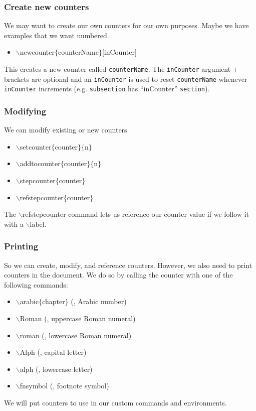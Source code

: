 \begin{frame}  \frametitle{Create new counters}
	We may want to create our own counters for our own purposes. Maybe we have examples that we want numbered.
	\begin{itemize}
		\item[] {\color{command}$\backslash$newcounter\color{braces}$\{${\color{black}counterName}$\}$\color{black}[inCounter]}
	\end{itemize}
	This creates a new counter called \texttt{counterName}. The \texttt{inCounter} argument $+$ brackets are optional and an \texttt{inCounter} is used to reset \texttt{counterName} whenever \texttt{inCounter} increments (e.g. \texttt{subsection} has ``inCounter'' \texttt{section}).
\end{frame}

\begin{frame}  \frametitle{Modifying}
	We can modify existing or new counters.
	\begin{itemize}
		\item[] {\color{command}$\backslash$setcounter\color{braces}$\{${\color{black}counter}$\}\{${\color{black}n}$\}$}
		\item[] {\color{command}$\backslash$addtocounter\color{braces}$\{${\color{black}counter}$\}\{${\color{black}n}$\}$}
		\item[] {\color{command}$\backslash$stepcounter\color{braces}$\{${\color{black}counter}$\}$}
		\item[] {\color{command}$\backslash$refstepcounter\color{braces}$\{${\color{black}counter}$\}$}
	\end{itemize}
	The {\color{command}$\backslash$refstepcounter} command lets us reference our counter value if we follow it with a {\color{command}$\backslash$label}.
\end{frame}

\begin{frame}  \frametitle{Printing}
	So we can create, modify, and reference counters. However, we also need to print counters in the document. We do so by calling the counter with one of the following commands:
	\setcounter{temp}{4}
	\begin{itemize}
		\item[] {\color{command}$\backslash$arabic}{\color{braces}$\{${\color{black}chapter}$\}$} (, Arabic number)
		\item[] {\color{command}$\backslash$Roman} (, uppercase Roman numeral)
		\item[] {\color{command}$\backslash$roman} (, lowercase Roman numeral)
		\item[] {\color{command}$\backslash$Alph} (, capital letter)
		\item[] {\color{command}$\backslash$alph} (, lowercase letter)
		\item[] {\color{command}$\backslash$fnsymbol} (, footnote symbol)
	\end{itemize}
	We will put counters to use in our custom commands and environments.
\end{frame}

